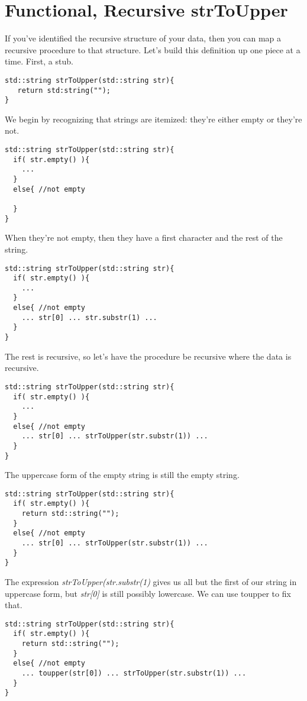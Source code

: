 \documentclass[]{tufte-handout}
\begin{document}
\section{Functional, Recursive strToUpper}

If you've identified the recursive structure of your data, then you can map a recursive procedure to that structure.  Let's build this definition up one piece at a time. First, a stub.
\begin{verbatim}
std::string strToUpper(std::string str){
   return std:string("");
}
\end{verbatim}

We begin by recognizing that strings are itemized: they're either empty or they're not.
\begin{verbatim}
std::string strToUpper(std::string str){
  if( str.empty() ){
    ...
  }
  else{ //not empty
  
  }
}
\end{verbatim}

When they're not empty, then they have a first character and the rest of the string. 
\begin{verbatim}
std::string strToUpper(std::string str){
  if( str.empty() ){
    ...
  }
  else{ //not empty
    ... str[0] ... str.substr(1) ...
  }
}
\end{verbatim}

The rest is recursive, so let's have the procedure be recursive where the data is recursive.
\begin{verbatim}
std::string strToUpper(std::string str){
  if( str.empty() ){
    ...
  }
  else{ //not empty
    ... str[0] ... strToUpper(str.substr(1)) ...
  }
}
\end{verbatim}

The uppercase form of the empty string is still the empty string. 
\begin{verbatim}
std::string strToUpper(std::string str){
  if( str.empty() ){
    return std::string("");
  }
  else{ //not empty
    ... str[0] ... strToUpper(str.substr(1)) ...
  }
}
\end{verbatim}

The expression \textit{strToUpper(str.substr(1)} gives us all but the first of our string in uppercase form, but \textit{str[0]} is still possibly lowercase.  We can use toupper to fix that.
\begin{verbatim}
std::string strToUpper(std::string str){
  if( str.empty() ){
    return std::string("");
  }
  else{ //not empty
    ... toupper(str[0]) ... strToUpper(str.substr(1)) ...
  }
}
\end{verbatim}
\end{document}
